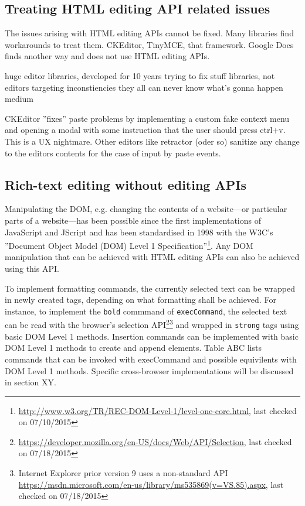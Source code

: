 \subsection{Treating HTML editing API related issues}

The issues arising with HTML editing APIs cannot be fixed. Many libraries find workarounds to treat them. CKEditor, TinyMCE, that framework. Google Docs finds another way and does not use HTML editing APIs.

huge editor libraries, developed for 10 years trying to fix stuff
libraries, not editors targeting inconstiencies
they all can never know what's gonna happen
medium

CKEditor ''fixes'' paste problems by implementing a custom fake context menu and opening a modal with some instruction that the user should press ctrl+v. This is a UX nightmare. Other editors like retractor (oder so) sanitize any change to the editors contents for the case of input by paste events.

\subsection{Rich-text editing without editing APIs}

Manipulating the DOM, e.g. changing the contents of a website---or particular parts of a website---has been possible since the first implementations of JavaScript and JScript and has been standardised in 1998 with the W3C's ''Document Object Model (DOM) Level 1 Specification''\footnote{\url{http://www.w3.org/TR/REC-DOM-Level-1/level-one-core.html}, last checked on 07/10/2015}. Any DOM manipulation that can be achieved with HTML editing APIs can also be achieved using this API.

To implement formatting commands, the currently selected text can be wrapped in newly created tags, depending on what formatting shall be achieved. For instance, to implement the \texttt{bold} commmand of \texttt{execCommand}, the selected text can be read with the browser's selection API\footnote{\url{https://developer.mozilla.org/en-US/docs/Web/API/Selection}, last checked on 07/18/2015}\footnote{Internet Explorer prior version 9 uses a non-standard API \url{https://msdn.microsoft.com/en-us/library/ms535869(v=VS.85).aspx}, last checked on 07/18/2015} and wrapped in \texttt{strong} tags using basic DOM Level 1 methods. Insertion commands can be implemented with basic DOM Level 1 methods to create and append elements. Table ABC lists commands that can be invoked with execCommand and possible equivilents with DOM Level 1 methods. Specific cross-browser implementations will be discussed in section XY.

